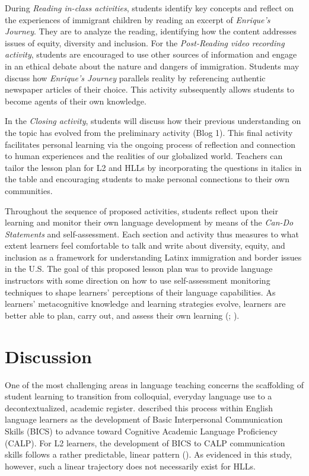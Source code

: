 \documentclass[output=paper]{langscibook}
\begin{document}
During \textit{Reading in-class activities}, students identify key concepts and reflect on the experiences of immigrant children by reading an excerpt of \textit{Enrique's Journey}. They are to analyze the reading, identifying how the content addresses issues of equity, diversity and inclusion. For the \textit{Post-Reading video recording activity}, students are encouraged to use other sources of information and engage in an ethical debate about the nature and dangers of immigration. Students may discuss how \textit{Enrique’s Journey} parallels reality by referencing authentic newspaper articles of their choice. This activity subsequently allows students to become agents of their own knowledge.\largerpage

In the \textit{Closing activity}, students will discuss how their previous understanding on the topic has evolved from the preliminary activity (Blog 1). This final activity facilitates personal learning via the ongoing process of reflection and connection to human experiences and the realities of our globalized world. Teachers can tailor the lesson plan for L2 and HLLs by incorporating the questions in italics in the table and encouraging students to make personal connections to their own communities.

Throughout the sequence of proposed activities, students reflect upon their learning and monitor their own language development by means of the \textit{Can-Do Statements} and self-assessment. Each section and activity thus measures to what extent learners feel comfortable to talk and write about diversity, equity, and inclusion as a framework for understanding Latinx immigration and border issues in the U.S. The goal of this proposed lesson plan was to provide language instructors with some direction on how to use self-assessment monitoring techniques to shape learners’ perceptions of their language capabilities. As learners’ metacognitive knowledge and learning strategies evolve, learners are better able to plan, carry out, and assess their own learning (\citealt{CouncilofEurope2002}; \citealt{LittlePerclova2001}).


\section{Discussion}\largerpage[2]

One of the most challenging areas in language teaching concerns the scaffolding of student learning to transition from colloquial, everyday language use to a decontextualized, academic register. \citet{Cummins1979} described this process within English language learners as the development of Basic Interpersonal Communication Skills (BICS) to advance toward Cognitive Academic Language Proficiency (CALP). For L2 learners, the development of BICS to CALP communication skills follows a rather predictable, linear pattern (\citealt{Montrul2011b}). As evidenced in this study, however, such a linear trajectory does not necessarily exist for HLLs.
\end{document}
